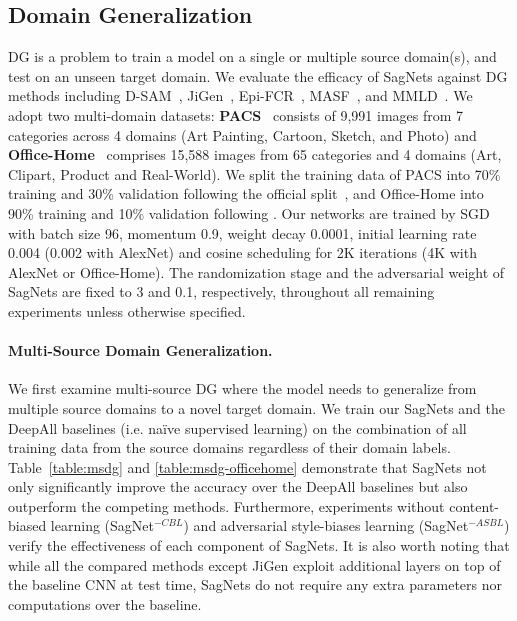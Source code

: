 \subsection{Domain Generalization}
\label{sec:exp-dg}
DG is a problem to train a model on a single or multiple source domain(s), and test on an unseen target domain.
We evaluate the efficacy of SagNets against  DG methods including D-SAM~\cite{innocente2018domain}, JiGen~\cite{carlucci2019domain}, Epi-FCR~\cite{li2019episodic}, MASF~\cite{dou2019domain}, and MMLD~\cite{matsuura2020domain}. 
We adopt two multi-domain datasets: \textbf{PACS}~\cite{li2017deeper} consists of 9,991 images from 7 categories across 4 domains (Art Painting, Cartoon, Sketch, and Photo) and \textbf{Office-Home}~\cite{venkateswara2017deep} comprises 15,588 images from 65 categories and 4 domains (Art, Clipart, Product and Real-World).
We split the training data of PACS into 70\% training and 30\% validation following the official split~\cite{li2017deeper}, and Office-Home into 90\% training and 10\% validation following \cite{innocente2018domain}.
Our networks are trained by SGD with batch size 96, momentum 0.9, weight decay 0.0001, initial learning rate 0.004 (0.002 with AlexNet) and cosine scheduling for 2K iterations (4K with AlexNet or Office-Home).
The randomization stage and the adversarial weight of SagNets are fixed to 3 and 0.1, respectively, throughout all remaining experiments unless otherwise specified.


\paragraph{\textnormal{\textbf{Multi-Source Domain Generalization.}}}
We first examine multi-source DG where the model needs to generalize from multiple source domains to a novel target domain. 
We train our SagNets and the DeepAll baselines (i.e. na\"ive supervised learning) on the combination of all training data from the source domains regardless of their domain labels.
Table~\ref{table:msdg} and \ref{table:msdg-officehome} demonstrate that SagNets not only significantly improve the accuracy over the DeepAll baselines but also outperform the competing methods.
Furthermore, experiments without content-biased learning (SagNet$^{-CBL}$) and adversarial style-biases learning (SagNet$^{-ASBL}$) verify the effectiveness of each component of SagNets.
It is also worth noting that while all the compared methods except JiGen exploit additional layers on top of the baseline CNN at test time, SagNets do not require any extra parameters nor computations over the baseline. 


